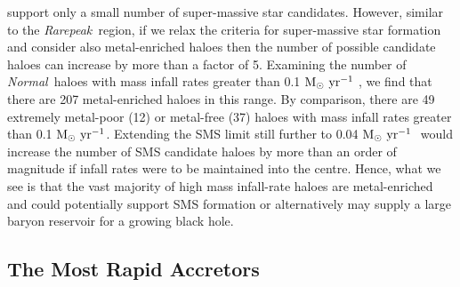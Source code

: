 \documentclass[graphics, twocolumn, usenatbib]{mn2e}
\newcommand{\msolaryr} {$\rm{M_{\odot}~yr^{-1}}~$}
\newcommand{\msolaryrc} {$\rm{M_{\odot}~yr^{-1}}$}
\newcommand{\rarepeak} {\textit{Rarepeak~}}
\newcommand{\normal} {\textit{Normal~}}
\begin{document}
support only a small number of super-massive star candidates. However, similar to the \rarepeak region,
if we relax the criteria for super-massive star formation and consider also metal-enriched haloes
then the number of possible candidate haloes can increase by more than a factor of 5.
Examining the number of \normal haloes with mass infall rates greater than 0.1 \msolaryr,
we find that there are 207 metal-enriched haloes in this range.
By comparison, there are 49 extremely metal-poor (12) or metal-free (37)
haloes with mass infall rates  greater than 0.1 \msolaryrc. Extending the
SMS limit still further to  0.04 \msolaryr \citep{Sakurai_2016} would increase the
number of SMS candidate haloes by more than an order of magnitude if infall
rates were to be maintained into the centre.
Hence, what we see is that the vast majority of high mass infall-rate haloes are metal-enriched
and could potentially support SMS formation or 
alternatively may supply a large baryon reservoir for a growing black hole. 


\subsection{The Most Rapid Accretors}
\end{document}
